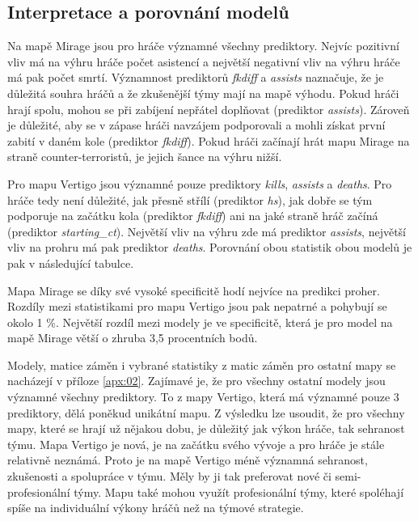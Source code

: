 \subsection{Interpretace a porovnání modelů}
Na mapě Mirage jsou pro hráče významné všechny prediktory. Nejvíc pozitivní vliv má na výhru hráče počet asistencí a největší negativní vliv
na výhru hráče má pak počet smrtí. Významnost prediktorů \textit{fkdiff} a \textit{assists} naznačuje, že je důležitá souhra hráčů a že zkušenější týmy
mají na mapě výhodu. Pokud hráči hrají spolu, mohou se při zabíjení nepřátel doplňovat (prediktor \textit{assists}). Zároveň je důležité, aby se v zápase
hráči navzájem podporovali a mohli získat první zabití v daném kole (prediktor \textit{fkdiff}). Pokud hráči začínají hrát mapu Mirage na straně counter-terroristů,
je jejich šance na výhru nižší.

Pro mapu Vertigo jsou  významné pouze prediktory \textit{kills}, \textit{assists} a \textit{deaths}. Pro hráče tedy není důležité, jak přesně
střílí (prediktor \textit{hs}), jak dobře se tým podporuje na začátku kola (prediktor \textit{fkdiff}) ani na jaké straně hráč začíná (prediktor \textit{starting\_ct}).
Největší vliv na výhru zde má prediktor \textit{assists}, největší vliv na prohru má pak prediktor \textit{deaths}. Porovnání obou statistik obou modelů je pak
v následující tabulce.



Mapa Mirage se  díky své vysoké specificitě hodí nejvíce na predikci proher. Rozdíly mezi statistikami pro mapu Vertigo jsou pak nepatrné a pohybují se okolo 1 \%.
Největší rozdíl mezi modely je ve specificitě, která je pro model na mapě Mirage větší o zhruba 3,5 procentních bodů.

Modely, matice záměn i vybrané statistiky z matic záměn pro ostatní mapy se nacházejí v příloze \ref{apx:02}. Zajímavé je, že pro všechny ostatní modely
jsou významné všechny prediktory. To z mapy Vertigo, která má významné pouze 3 prediktory, dělá poněkud unikátní mapu. Z výsledku lze usoudit, že
pro všechny mapy, které se hrají už nějakou dobu, je důležitý jak výkon hráče, tak sehranost týmu. Mapa Vertigo je nová, je na začátku svého
vývoje a pro hráče je stále relativně neznámá. Proto je na mapě Vertigo méně významná sehranost, zkušenosti a spolupráce v týmu. Měly by ji tak preferovat
nové či semi-profesionální týmy. Mapu také mohou využít profesionální týmy, které spoléhají spíše na individuální výkony hráčů než na týmové strategie.

